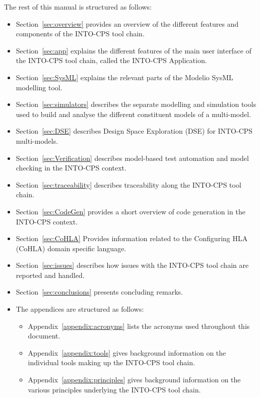 The rest of this manual is structured as follows:
%
%
%
\begin{itemize}
%
\item  Section~\ref{sec:overview} provides an overview of the different features and components of the INTO-CPS tool chain.
%
\item  Section~\ref{sec:app} explains the different features of the main user interface of the INTO-CPS tool chain, called the INTO-CPS Application.
%
\item  Section~\ref{sec:SysML} explains the relevant parts of the Modelio SysML modelling tool.
%
\item  Section~\ref{sec:simulators} describes the separate modelling and simulation tools used to build and analyse the different constituent models of a multi-model.
%
\item  Section~\ref{sec:DSE} describes Design Space Exploration (DSE) for INTO-CPS multi-models.
%
\item  Section~\ref{sec:Verification} describes model-based test automation and model checking in the INTO-CPS context.
%
\item  Section~\ref{sec:traceability} describes traceability along the INTO-CPS tool chain.
%
\item  Section~\ref{sec:CodeGen} provides a short overview of code generation in the INTO-CPS context.
\item  Section~\ref{sec:CoHLA} Provides information related to the Configuring HLA (CoHLA) domain specific language.
%
\item  Section~\ref{sec:issues} describes how issues with the INTO-CPS tool chain are reported and handled.
%
\item  Section~\ref{sec:conclusions} presents concluding remarks.
%
\item  The appendices are structured as follows:
%
\begin{itemize}
%
\item  Appendix~\ref{appendix:acronyms} lists the acronyms used throughout this document.
%
\item  Appendix~\ref{appendix:tools} gives background information on the individual tools making up the INTO-CPS tool chain.
%
\item  Appendix~\ref{appendix:principles} gives background information on the various principles underlying the INTO-CPS tool chain.
%
%
\end{itemize}
%
\end{itemize}
